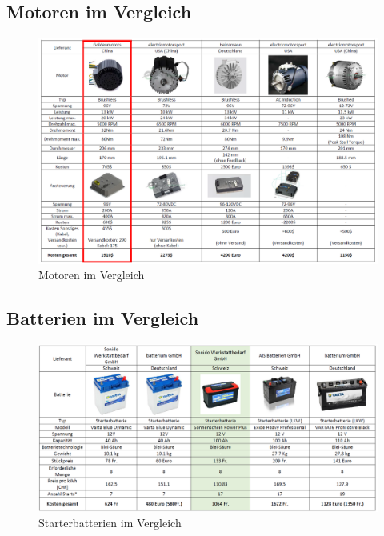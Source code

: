 \begin{appendix} %

\begin{landscape}
\section{Motoren im Vergleich}\label{appsec:Motoren}
	\begin{figure}[H]
	\begin{center}
		\includegraphics[width=240mm]{appendix/Motoren.png}
		\caption[Motoren im Vergleich]{Motoren im Vergleich} %
		\label{fig:Motoren}
	\end{center}
\end{figure}
\end{landscape}

	
\begin{landscape}
\section{Batterien im Vergleich}\label{appsec:Batterie}
	\begin{figure}[H]
		\begin{center}
			\includegraphics[width=240mm]{appendix/BatterieStart.png}
			\caption[Starterbatterien im Vergleich]{Starterbatterien im Vergleich} %
			\label{fig:Starterbatterie}
		\end{center}
	\end{figure}


\end{landscape}
\end{appendix}

